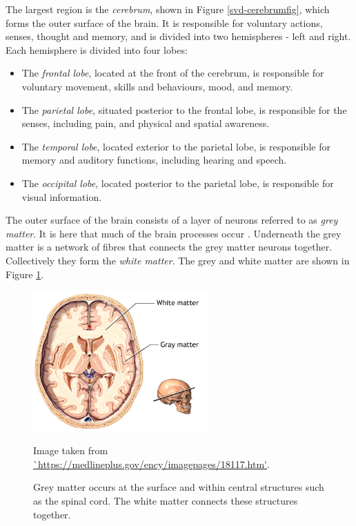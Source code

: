 The largest region is the \textit{cerebrum}, shown in Figure \ref{svd-cerebrumfig}, which forms the outer surface of the brain. It is responsible for voluntary actions, senses, thought and memory, and is divided into two hemispheres - left and right. Each hemisphere is divided into four lobes:
 \begin{itemize}
	\item The \textit{frontal lobe}, located at the front of the cerebrum, is responsible for voluntary movement, skills and behaviours, mood, and memory.
	\item The \textit{parietal lobe}, situated posterior to the frontal lobe, is responsible for the senses, including pain, and physical and spatial awareness.
	\item The \textit{temporal lobe}, located exterior to the parietal lobe, is responsible for memory and auditory functions, including hearing and speech.
	\item The \textit{occipital lobe}, located posterior to the parietal lobe, is responsible for visual information.
\end{itemize}

The outer surface of the brain consists of a layer of neurons referred to as \textit{grey matter}. It is here that much of the brain processes occur \citep{Dafny1997}. Underneath the grey matter is a network of fibres that connects the grey matter neurons together. Collectively they form the \textit{white matter}. The grey and white matter are shown in Figure \ref{svd-greywhitefig}.

\begin{figure}[ht]
	\centering
	\includegraphics[width=0.6\textwidth]{Images/2_white_vs_grey.png}
	\caption{Grey matter occurs at the surface and within central structures such as the spinal cord. The white matter connects these structures together.}
	\small Image taken from \url{`https://medlineplus.gov/ency/imagepages/18117.htm'}.
	\label{svd-greywhitefig}
\end{figure}

